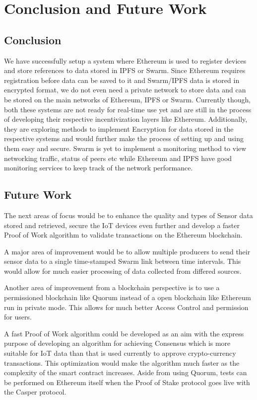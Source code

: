 \documentclass[11pt,openright]{report}
\begin{document}
\chapter{Conclusion and Future Work} \label{chapter:conclusion}
\section{Conclusion}
We have successfully setup a system where Ethereum is used to register devices and store references to data stored in IPFS or Swarm. Since Ethereum requires registration before data can be saved to it and Swarm/IPFS data is stored in encrypted format, we do not even need a private network to store data and can be stored on the main networks of Ethereum, IPFS or Swarm. Currently though, both these systems are not ready for real-time use yet and are still in the process of developing their respective incentivization layers like Ethereum. Additionally, they are exploring methods to implement Encryption for data stored in the respective systems and would further make the process of setting up and using them easy and secure. Swarm is yet to implement a monitoring method to view networking traffic, status of peers etc while Ethereum and IPFS have good monitoring services to keep track of the network performance.

\section{Future Work}
The next areas of focus would be to enhance the quality and types of Sensor data stored and retrieved, secure the IoT devices even further and develop a faster Proof of Work algorithm to validate transactions on the Ethereum blockchain. 

A major area of improvement would be to allow multiple producers to send their sensor data to a single time-stamped Swarm link between time intervals. This would allow for much easier processing of data collected from differed sources.

Another area of improvement from a blockchain perspective is to use a permissioned blockchain like Quorum instead of a open blockchain like Ethereum run in private mode. This allows for much better Access Control and permission for users.

A fast Proof of Work algorithm could be developed as an aim with the express purpose of developing an algorithm for achieving Consensus which is more suitable for IoT data than that is used currently to approve crypto-currency transactions. This optimization would make the algorithm much faster as the complexity of the smart contract increases. Aside from using Quorum, tests can be performed on Ethereum itself when the Proof of Stake protocol goes live with the Casper protocol.
\end{document}
